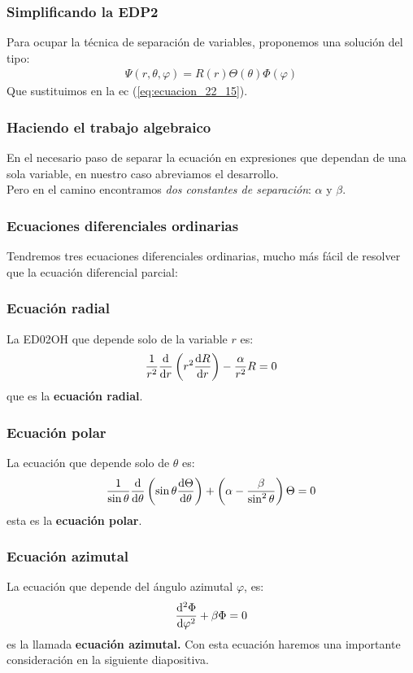 \documentclass[12pt]{beamer}
\begin{document}
\begin{frame}
\frametitle{Simplificando la EDP2}
Para ocupar la técnica de separación de variables, proponemos una solución del tipo:
\pause
\begin{align*}
\Psi(r, \theta, \varphi) = R(r) \Theta (\theta) \Phi(\varphi)
\end{align*}
\pause
Que sustituimos en la ec (\ref{eq:ecuacion_22_15}).
\end{frame}
\begin{frame}
\frametitle{Haciendo el trabajo algebraico}
En el necesario paso de separar la ecuación en expresiones que dependan de una sola variable, en nuestro caso abreviamos el desarrollo.
\\
\bigskip
\pause
Pero en el camino encontramos \emph{dos constantes de separación}: $\alpha$ y $\beta$.
\end{frame}
\begin{frame}
\frametitle{Ecuaciones diferenciales ordinarias}
Tendremos tres ecuaciones diferenciales ordinarias, mucho más fácil de resolver que la ecuación diferencial parcial:
\end{frame}
\begin{frame}
\frametitle{Ecuación radial}
La ED02OH que depende solo de la variable $r$ es:
\pause
\begin{align}
\dfrac{1}{r^{2}} \dv{r} \left( r^{2} \dv{R}{r} \right) - \dfrac{\alpha}{r^{2}} R = 0
\label{eq:ecuacion_26_1a}
\end{align}
que es la \textbf{ecuación radial}.
\end{frame}
\begin{frame}
\frametitle{Ecuación polar}
La ecuación que depende solo de $\theta$ es:
\pause
\begin{align}
\dfrac{1}{\sin \theta} \dv{\theta} \left( \sin \theta \dv{\Theta}{\theta} \right) + \left( \alpha - \dfrac{\beta}{\sin^{2} \theta} \right) \Theta = 0
\label{eq:ecuacion_26_1b}
\end{align}
esta es la \textbf{ecuación polar}.
\end{frame}
\begin{frame}
\frametitle{Ecuación azimutal}
La ecuación que depende del ángulo azimutal $\varphi$, es:
\begin{align}
\dv[2]{\Phi}{\varphi} + \beta \Phi = 0
\label{eq:ecuacion_26_1c}
\end{align}
es la llamada \textbf{ecuación azimutal.}
\pause
Con esta ecuación haremos una importante consideración en la siguiente diapositiva.
\end{frame}
\end{document}
